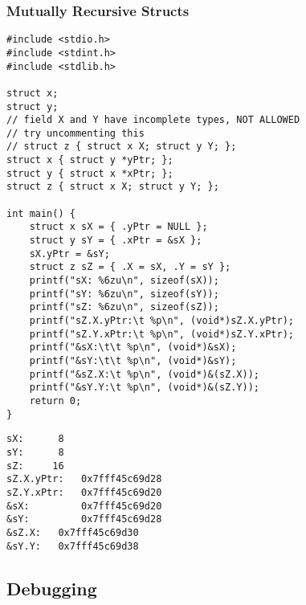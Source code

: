 \documentclass[11pt]{article}
\begin{document}
\subsubsection{Mutually Recursive Structs}
\label{sec:org9603bd0}

\begin{verbatim}
#include <stdio.h>
#include <stdint.h>
#include <stdlib.h>

struct x;
struct y;
// field X and Y have incomplete types, NOT ALLOWED
// try uncommenting this
// struct z { struct x X; struct y Y; };
struct x { struct y *yPtr; };
struct y { struct x *xPtr; };
struct z { struct x X; struct y Y; };

int main() {
    struct x sX = { .yPtr = NULL };
    struct y sY = { .xPtr = &sX };
    sX.yPtr = &sY;
    struct z sZ = { .X = sX, .Y = sY };
    printf("sX: %6zu\n", sizeof(sX));
    printf("sY: %6zu\n", sizeof(sY));
    printf("sZ: %6zu\n", sizeof(sZ));
    printf("sZ.X.yPtr:\t %p\n", (void*)sZ.X.yPtr);
    printf("sZ.Y.xPtr:\t %p\n", (void*)sZ.Y.xPtr);
    printf("&sX:\t\t %p\n", (void*)&sX);
    printf("&sY:\t\t %p\n", (void*)&sY);
    printf("&sZ.X:\t %p\n", (void*)&(sZ.X));
    printf("&sY.Y:\t %p\n", (void*)&(sZ.Y));
    return 0;
}
\end{verbatim}

\begin{verbatim}
sX:      8
sY:      8
sZ:     16
sZ.X.yPtr:	 0x7fff45c69d28
sZ.Y.xPtr:	 0x7fff45c69d20
&sX:		 0x7fff45c69d20
&sY:		 0x7fff45c69d28
&sZ.X:	 0x7fff45c69d30
&sY.Y:	 0x7fff45c69d38
\end{verbatim}


\subsection{Debugging}
\label{sec:org977676c}
\end{document}
